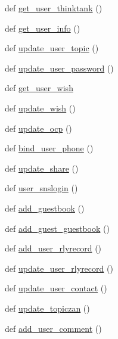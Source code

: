 \begin{DoxyCompactItemize}
\item 
def \hyperlink{namespaceapp_1_1api__1__0_1_1user_a7c088bb5f7150ff7ea87f1ddea02ba5e}{get\+\_\+user\+\_\+thinktank} ()
\item 
def \hyperlink{namespaceapp_1_1api__1__0_1_1user_aa9a18cd0a720a6b498b2bd35be03ea4e}{get\+\_\+user\+\_\+info} ()
\item 
def \hyperlink{namespaceapp_1_1api__1__0_1_1user_aba3f803f01094c46bab3a2537f5a0e1b}{update\+\_\+user\+\_\+topic} ()
\item 
def \hyperlink{namespaceapp_1_1api__1__0_1_1user_aeb3490c84ceb14d756200260e7c8b2fd}{update\+\_\+user\+\_\+password} ()
\item 
def \hyperlink{namespaceapp_1_1api__1__0_1_1user_a87d06d052af0b620ed79eb30b38dbff4}{get\+\_\+user\+\_\+wish}
\item 
def \hyperlink{namespaceapp_1_1api__1__0_1_1user_a7c93d9eed896ab2dcd9134e48eeb88af}{update\+\_\+wish} ()
\item 
def \hyperlink{namespaceapp_1_1api__1__0_1_1user_a59970954545af8670d30330ede81432d}{update\+\_\+ocp} ()
\item 
def \hyperlink{namespaceapp_1_1api__1__0_1_1user_a7c93ceae1416dc8559a680ff52c5d95a}{bind\+\_\+user\+\_\+phone} ()
\item 
def \hyperlink{namespaceapp_1_1api__1__0_1_1user_abb0873e34fcd78133649248500212027}{update\+\_\+share} ()
\item 
def \hyperlink{namespaceapp_1_1api__1__0_1_1user_a8af2a784276ffefaf30a1589706385ff}{user\+\_\+snslogin} ()
\item 
def \hyperlink{namespaceapp_1_1api__1__0_1_1user_aaa4d6f6a5a926df2af8831c7d0c8d575}{add\+\_\+guestbook} ()
\item 
def \hyperlink{namespaceapp_1_1api__1__0_1_1user_a7896b09c861c48305106d0f9c184fb4a}{add\+\_\+guest\+\_\+guestbook} ()
\item 
def \hyperlink{namespaceapp_1_1api__1__0_1_1user_a45574fd76cd4680078bcd48e1e462fba}{add\+\_\+user\+\_\+rlyrecord} ()
\item 
def \hyperlink{namespaceapp_1_1api__1__0_1_1user_a697e49befcd1e9bcac1e8ad2dc5d3f79}{update\+\_\+user\+\_\+rlyrecord} ()
\item 
def \hyperlink{namespaceapp_1_1api__1__0_1_1user_a18b78d43a0f1126b63a6a559550df935}{update\+\_\+user\+\_\+contact} ()
\item 
def \hyperlink{namespaceapp_1_1api__1__0_1_1user_a4af24f3513b6783e3d1d351311db2f11}{update\+\_\+topiczan} ()
\item 
def \hyperlink{namespaceapp_1_1api__1__0_1_1user_a00f250eb27dda6e0909404b0d9c3b12e}{add\+\_\+user\+\_\+comment} ()
\end{DoxyCompactItemize}


